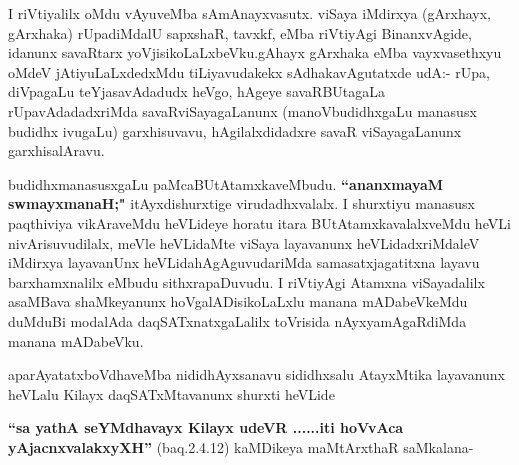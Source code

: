 \begin{artha}
I riVtiyalilx oMdu vAyuveMba sAmAnayxvasutx. viSaya iMdirxya
(gArxhayx, gArxhaka)  rUpadiMdalU sapxshaR, tavxkf,
eMba riVtiyAgi BinanxvAgide, idanunx savaRtarx
yoVjisikoLaLxbeVku.gAhayx gArxhaka eMba vayxvasethxyu oMdeV
jAtiyuLaLxdedxMdu tiLiyavudakekx sAdhakavAgutatxde udA:- rUpa, diVpagaLu
teYjasavAdadudx heVgo, hAgeye savaRBUtagaLa rUpavAdadadxriMda
savaRviSayagaLanunx (manoVbudidhxgaLu manasusx budidhx ivugaLu)
garxhisuvavu, hAgilalxdidadxre savaR viSayagaLanunx garxhisalAravu.

budidhxmanasusxgaLu paMcaBUtAtamxkaveMbudu. \textbf{``ananxmayaM swmayxmanaH;"}
 itAyxdishurxtige virudadhxvalalx. I shurxtiyu manasusx paqthiviya
vikAraveMdu heVLideye horatu itara BUtAtamxkavalalxveMdu heVLi
nivArisuvudilalx, meVle heVLidaMte viSaya layavanunx heVLidadxriMdaleV
iMdirxya layavanUnx heVLidahAgAguvudariMda samasatxjagatitxna layavu
barxhamxnalilx eMbudu sithxrapaDuvudu. I riVtiyAgi Atamxna
viSayadalilx asaMBava shaMkeyanunx hoVgalADisikoLaLxlu manana
mADabeVkeMdu duMduBi modalAda daqSATxnatxgaLalilx toVrisida
nAyxyamAgaRdiMda manana mADabeVku.
\end{artha}

\begin{artha}
aparAyatatxboVdhaveMba nididhAyxsanavu sididhxsalu AtayxMtika
layavanunx heVLalu Kilayx daqSATxMtavanunx shurxti heVLide
\end{artha}

\begin{artha}
\textbf{``sa yathA seYMdhavayx Kilayx udeVR ......iti hoVvAca yAjacnxvalakxyXH''} (baq.2.4.12) kaMDikeya maMtArxthaR saMkalana-
\end{artha}


